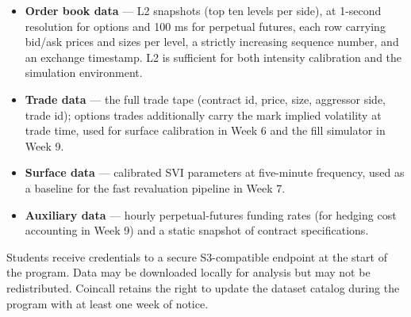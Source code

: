 \documentclass[
]{article}
\providecommand{\tightlist}{%
  \setlength{\itemsep}{0pt}\setlength{\parskip}{0pt}}
\begin{document}
\begin{itemize}
\tightlist
\item
  \textbf{Order book data} --- L2 snapshots (top ten levels per side),
  at 1-second resolution for options and 100 ms for perpetual futures,
  each row carrying bid/ask prices and sizes per level, a strictly
  increasing sequence number, and an exchange timestamp. L2 is
  sufficient for both intensity calibration and the simulation
  environment.
\item
  \textbf{Trade data} --- the full trade tape (contract id, price, size,
  aggressor side, trade id); options trades additionally carry the mark
  implied volatility at trade time, used for surface calibration in Week
  6 and the fill simulator in Week 9.
\item
  \textbf{Surface data} --- calibrated SVI parameters at five-minute
  frequency, used as a baseline for the fast revaluation pipeline in
  Week 7.
\item
  \textbf{Auxiliary data} --- hourly perpetual-futures funding rates
  (for hedging cost accounting in Week 9) and a static snapshot of
  contract specifications.
\end{itemize}

Students receive credentials to a secure S3-compatible endpoint at the
start of the program. Data may be downloaded locally for analysis but
may not be redistributed. Coincall retains the right to update the
dataset catalog during the program with at least one week of notice.
\end{document}
